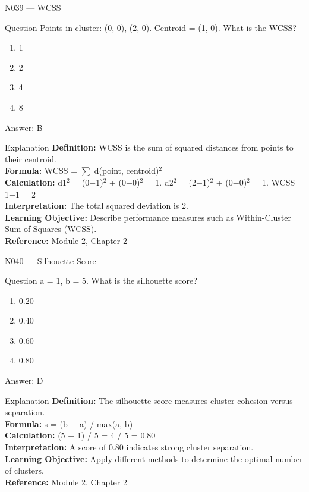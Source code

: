 \documentclass[aspectratio=169,8pt]{beamer}
\begin{document}
	\begin{frame}{N039 --- WCSS}
		\begin{block}{Question}
			Points in cluster: (0, 0), (2, 0). Centroid = (1, 0). What is the WCSS?
			\begin{enumerate}
				\item 1
				\item 2
				\item 4
				\item 8
			\end{enumerate}
		\end{block}
		\begin{exampleblock}{Answer: B}\end{exampleblock}
		\begin{block}{Explanation}
			\textbf{Definition:} WCSS is the sum of squared distances from points to their centroid.\\
			\textbf{Formula:} WCSS = $\sum$ d(point, centroid)$^{2}$\\
			\textbf{Calculation:} d1$^{2}$ = (0$-$1)$^{2}$ + (0$-$0)$^{2}$ = 1. d2$^{2}$ = (2$-$1)$^{2}$ + (0$-$0)$^{2}$ = 1. WCSS = 1+1 = 2\\
			\textbf{Interpretation:} The total squared deviation is 2.\\
			\textbf{Learning Objective:} Describe performance measures such as Within-Cluster Sum of Squares (WCSS).\\
			\textbf{Reference:} Module 2, Chapter 2
		\end{block}
	\end{frame}
	
	\begin{frame}{N040 --- Silhouette Score}
		\begin{block}{Question}
			a = 1, b = 5. What is the silhouette score?
			\begin{enumerate}
				\item 0.20
				\item 0.40
				\item 0.60
				\item 0.80
			\end{enumerate}
		\end{block}
		\begin{exampleblock}{Answer: D}\end{exampleblock}
		\begin{block}{Explanation}
			\textbf{Definition:} The silhouette score measures cluster cohesion versus separation.\\
			\textbf{Formula:} s = (b $-$ a) / max(a, b)\\
			\textbf{Calculation:} (5 $-$ 1) / 5 = 4 / 5 = 0.80\\
			\textbf{Interpretation:} A score of 0.80 indicates strong cluster separation.\\
			\textbf{Learning Objective:} Apply different methods to determine the optimal number of clusters.\\
			\textbf{Reference:} Module 2, Chapter 2
		\end{block}
	\end{frame}
	
\end{document}
